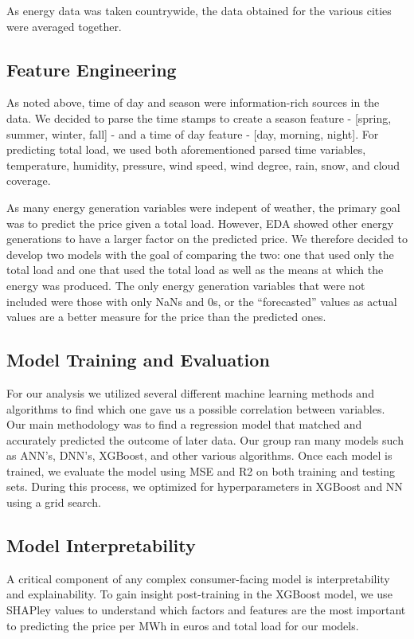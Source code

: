 \documentclass[10pt]{article}
\begin{document}
As energy data was taken countrywide, the data obtained for the various cities were averaged together. 

\subsection{Feature Engineering}
As noted above, time of day and season were information-rich sources in the data. We decided to parse the time stamps to create a season feature - [spring, summer, winter, fall] - and a time of day feature - [day, morning, night]. For predicting total load, we used both aforementioned parsed time variables, temperature, humidity, pressure, wind speed, wind degree, rain, snow, and cloud coverage. 

As many energy generation variables were indepent of weather, the primary goal was to predict the price given a total load. However, EDA showed other energy generations to have a larger factor on the predicted price. We therefore decided to develop two models with the goal of comparing the two: one that used only the total load and one that used the total load as well as the means at which the energy was produced. The only energy generation variables that were not included were those with only NaNs and 0s, or the “forecasted” values as actual values are a better measure for the price than the predicted ones.

\subsection{Model Training and Evaluation}
For our analysis we utilized several different machine learning methods and algorithms to find which one gave us a possible correlation between variables. Our main methodology was to find a regression model that matched and accurately predicted the outcome of later data. Our group ran many models such as ANN’s, DNN’s, XGBoost, and other various algorithms. Once each model is trained, we evaluate the model using MSE and R2 on both training and testing sets. During this process, we optimized for hyperparameters in XGBoost and NN using a grid search.

\subsection{Model Interpretability}
A critical component of any complex consumer-facing model is interpretability and explainability. To gain insight post-training in the XGBoost model, we use SHAPley values to understand which factors and features are the most important to predicting the price per MWh in euros and total load for our models.
\end{document}
